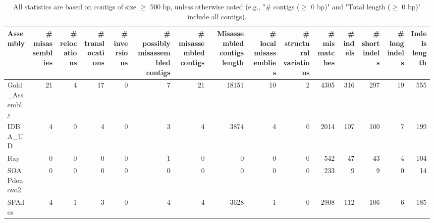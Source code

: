 \documentclass[12pt,a4paper]{article}
\begin{document}
\begin{table}[ht]
\begin{center}
\caption{All statistics are based on contigs of size $\geq$ 500 bp, unless otherwise noted (e.g., "\# contigs ($\geq$ 0 bp)" and "Total length ($\geq$ 0 bp)" include all contigs).}
\begin{tabular}{|l*{14}{|r}|}
\hline
Assembly & \# misassemblies &     \# relocations &     \# translocations &     \# inversions & \# possibly misassembled contigs & \# misassembled contigs & Misassembled contigs length & \# local misassemblies & \# structural variations & \# mismatches & \# indels &     \# short indels &     \# long indels & Indels length \\ \hline
Gold\_Assembly & 21 & 4 & 17 & 0 & 7 & 21 & 18151 & 10 & 2 & 4305 & 316 & 297 & 19 & 555 \\ \hline
IDBA\_UD & 4 & 0 & 4 & 0 & 3 & 4 & 3874 & 4 & 0 & 2014 & 107 & 100 & 7 & 199 \\ \hline
Ray & 0 & 0 & 0 & 0 & 1 & 0 & 0 & 0 & 0 & 542 & 47 & 43 & 4 & 104 \\ \hline
SOAPdenovo2 & 0 & 0 & 0 & 0 & 0 & 0 & 0 & 0 & 0 & 233 & 9 & 9 & 0 & 14 \\ \hline
SPAdes & 4 & 1 & 3 & 0 & 4 & 4 & 3628 & 1 & 0 & 2908 & 112 & 106 & 6 & 185 \\ \hline
\end{tabular}
\end{center}
\end{table}
\end{document}
